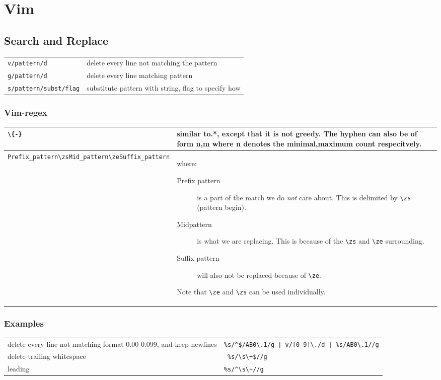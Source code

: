 \section{Vim}

\subsection{Search and Replace}
\begin{longtable}{l l}
    \verb|v/pattern/d| & delete every line not matching the pattern \\
    \verb|g/pattern/d| & delete every line matching pattern \\
    \verb|s/pattern/subst/flag| & substitute pattern with string,
                                  flag to specify how\\
\end{longtable}

\subsubsection{Vim-regex}

\begin{tabular}{|p{5cm}| p{10cm}|}
    \hline
\verb~\{-}~ & similar to\text{ }.*, except that it is not greedy. The hyphen can also
    be of form n,m where n denotes the minimal,maximum count respecitvely. \\
    \hline

    \verb~Prefix_pattern\zsMid_pattern\zeSuffix_pattern~
    & where:
    \begin{description}
        \item[Prefix pattern] is a part of the match we do \textit{not} care about.
            This is delimited by \verb~\zs~ (pattern begin).
        \item[Midpattern] is what we are replacing. This is because of the
            \verb~\zs~ and \verb~\ze~ surrounding.
        \item[Suffix pattern] will also not be replaced because of \verb~\ze~.
    \end{description}
    Note that \verb~\ze~ and \verb~\zs~ can be used individually.
\end{tabular}


\subsubsection{Examples}

\begin{longtable}{l l}
    delete every line not matching format 0.00 0.099, and keep newlines & 
    \verb~%s/^$/AB0\.1/g | v/[0-9]\./d | %s/AB0\.1//g~ \\
    delete trailing whitespace & \verb~ %s/\s\+$//g~ \\
    leading & \verb~%s/^\s\+//g~ \\
\end{longtable}
